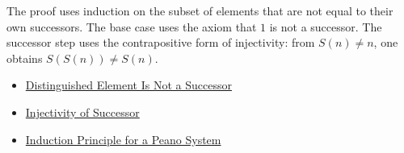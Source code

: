 \begin{remark*}
The proof uses induction on the subset of elements that are not equal to
their own successors. The base case uses the axiom that $1$ is not a
successor. The successor step uses the contrapositive form of injectivity:
from $S(n)\neq n$, one obtains $S(S(n))\neq S(n)$.
\end{remark*}

\begin{dependencies}
\begin{itemize}
  \item \hyperref[ax:peano-one-not-successor]{Distinguished Element Is Not a Successor}
  \item \hyperref[ax:peano-successor-injective]{Injectivity of Successor}
  \item \hyperref[thm:induction-principle-for-peano-system]{Induction Principle for a Peano System}
\end{itemize}
\end{dependencies}

